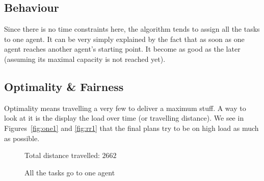 \documentclass[11pt,a4paper]{article}
\begin{document}
\subsection*{Behaviour}

Since there is no time constraints here, the algorithm tends to assign all the
tasks to one agent. It can be very simply explained by the fact that as soon as
one agent reaches another agent's starting point. It become as good as the
later (assuming its maximal capacity is not reached yet).


\subsection*{Optimality \& Fairness}

Optimality means travelling a very few to deliver a maximum stuff. A way to
look at it is the display the load over time (or travelling distance). We see
in Figures~\ref{fig:one1} and \ref{fig:rr1} that the final plans try to be on
high load as much as possible.

\begin{figure}[ht!]
    \begin{center}
    \caption{All the tasks go to one agent}{Total distance travelled: $2662$}
    \label{fig:one}
    \end{center}
\end{figure}
\end{document}
